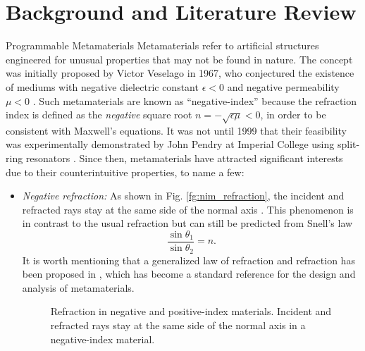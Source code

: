 
\graphicspath{{assets/chapter_2/}}

\chapter{Background and Literature Review}\label{ch:background}

\begin{section}{}
	\begin{subsection}{Programmable Metamaterials}
		Metamaterials refer to artificial structures engineered for unusual properties that may not be found in nature.
		The concept was initially proposed by Victor Veselago in 1967, who conjectured the existence of mediums with negative dielectric constant $\epsilon < 0$ and negative permeability $\mu < 0$ \cite{Veselago1968}.
		Such metamaterials are known as ``negative-index'' because the refraction index is defined as the \emph{negative} square root $n = - \sqrt{\epsilon \mu} < 0$, in order to be consistent with Maxwell's equations.
		It was not until 1999 that their feasibility was experimentally demonstrated by John Pendry at Imperial College using split-ring resonators \cite{Pendry1999}.
		Since then, metamaterials have attracted significant interests due to their counterintuitive properties, to name a few:
		\begin{itemize}
			\item \emph{Negative refraction:} As shown in Fig. \ref{fg:nim_refraction}, the incident and refracted rays stay at the same side of the normal axis \cite{Veselago1968}. This phenomenon is in contrast to the usual refraction but can still be predicted from Snell's law
			\begin{equation}
				\frac{\sin \theta_1}{\sin \theta_2} = n.
			\end{equation}
			It is worth mentioning that a generalized law of refraction and refraction has been proposed in \cite{Yu2011}, which has become a standard reference for the design and analysis of metamaterials.
			\begin{figure}[H]
				\centering
				\caption{Refraction in negative and positive-index materials. Incident and refracted rays stay at the same side of the normal axis in a negative-index material.}

\end{figure}
\end{itemize}
\end{subsection}
\end{section}
